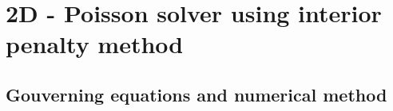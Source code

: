 \section{2D - Poisson solver using interior penalty method}

\subsection{Gouverning equations and numerical method}


